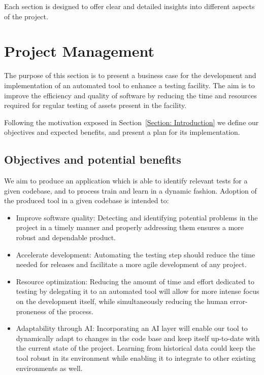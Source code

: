 \documentclass[a4paper, 11pt]{report}
\begin{document}
Each section is designed to offer clear and detailed insights into different aspects of the project.

\chapter{Project Management}\label{Project Management}
The purpose of this section is to present a business case for the development and implementation of an automated tool to enhance a testing facility. The aim is to improve the efficiency and quality of software by reducing the time and resources required for regular testing of assets present in the facility.

Following the motivation exposed in Section~\ref{Section: Introduction} we define our objectives and expected benefits, and present a plan for its implementation.

\section{Objectives and potential benefits}\label{Intro:Objectives}
We aim to produce an application which is able to identify relevant tests for a given codebase, and to process train and learn in a dynamic fashion. Adoption of the produced tool in a given codebase is intended to:
\begin{itemize}
    \item Improve software quality: Detecting and identifying potential problems in the project in a timely manner and properly addressing them ensures a more robust and dependable product.
    \item Accelerate development: Automating the testing step should reduce the time needed for releases and facilitate a more agile development of any project.
    \item Resource optimization: Reducing the amount of time and effort dedicated to testing by delegating it to an automated tool will allow for more intense focus on the development itself, while simultaneously reducing the human error-proneness of the process.
    \item Adaptability through AI: Incorporating an AI layer will enable our tool to dynamically adapt to changes in the code base and keep itself up-to-date with the current state of the project. Learning from historical data could keep the tool robust in its environment while enabling it to integrate to other existing environments as well.
\end{itemize}
\end{document}
